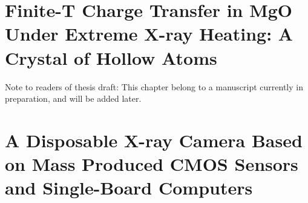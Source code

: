 \documentclass [11pt, proquest, article] {uwthesis}[2016/11/22]
\begin{document}
\chapter{Finite-T Charge Transfer in MgO Under Extreme X-ray Heating: A Crystal of Hollow Atoms}
\label{mgo}
Note to readers of thesis draft: This chapter belong to a manuscript currently in preparation, and will be added later. 

\chapter{A Disposable X-ray Camera Based on Mass Produced CMOS Sensors and
Single-Board Computers}





\end{document}
